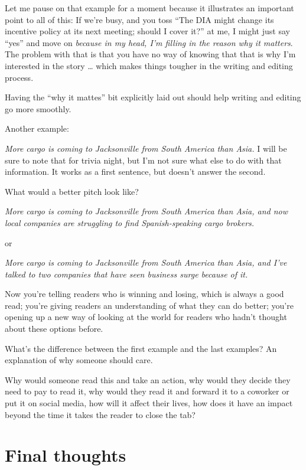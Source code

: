 \documentclass[
  11pt,
  american,
  letterpaperpaper,
  extrafontsizes,onecolumn,openright
  ]{memoir}
\begin{document}
Let me pause on that example for a moment because it illustrates an important point to all of this: If we're busy, and you toss \enquote{The DIA might change its incentive policy at its next meeting; should I cover it?} at me, I might just say \enquote{yes} and move on \emph{because in my head, I'm filling in the reason why it matters}. The problem with that is that you have no way of knowing that that is why I'm interested in the story \ldots{} which makes things tougher in the writing and editing process.

Having the \enquote{why it mattes} bit explicitly laid out should help writing and editing go more smoothly.

Another example:

\emph{More cargo is coming to Jacksonville from South America than Asia.} I will be sure to note that for trivia night, but I'm not sure what else to do with that information. It works as a first sentence, but doesn't answer the second.

What would a better pitch look like?

\emph{More cargo is coming to Jacksonville from South America than Asia, and now local companies are struggling to find Spanish-speaking cargo brokers.}

or

\emph{More cargo is coming to Jacksonville from South America than Asia, and I've talked to two companies that have seen business surge because of it.}

Now you're telling readers who is winning and losing, which is always a good read; you're giving readers an understanding of what they can do better; you're opening up a new way of looking at the world for readers who hadn't thought about these options before.

What's the difference between the first example and the last examples? An explanation of why someone should care.

Why would someone read this and take an action, why would they decide they need to pay to read it, why would they read it and forward it to a coworker or put it on social media, how will it affect their lives, how does it have an impact beyond the time it takes the reader to close the tab?

\hypertarget{final-thoughts-3}{%
\section*{Final thoughts}\label{final-thoughts-3}}
\end{document}
